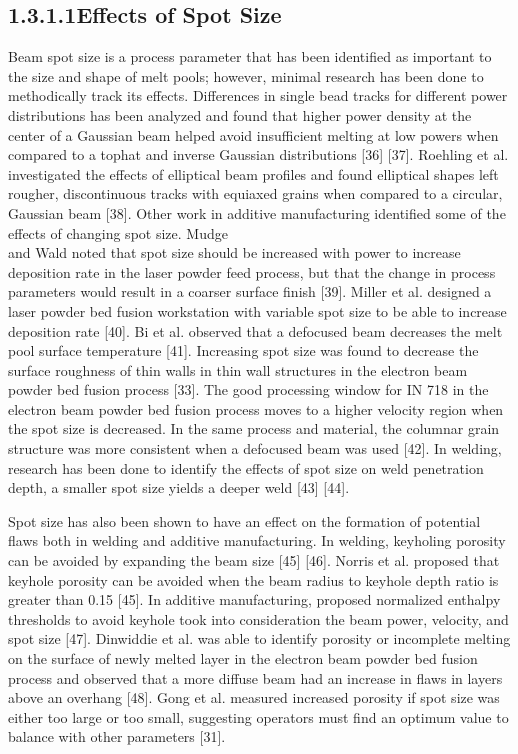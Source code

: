 \documentclass[10pt]{article}
\begin{document}
\subsection*{1.3.1.1Effects of Spot Size}
Beam spot size is a process parameter that has been identified as important to the size and shape of melt pools; however, minimal research has been done to methodically track its effects. Differences in single bead tracks for different power distributions has been analyzed and found that higher power density at the center of a Gaussian beam helped avoid insufficient melting at low powers when compared to a tophat and inverse Gaussian distributions [36] [37]. Roehling et al. investigated the effects of elliptical beam profiles and found elliptical shapes left rougher, discontinuous tracks with equiaxed grains when compared to a circular, Gaussian beam [38]. Other work in additive manufacturing identified some of the effects of changing spot size. Mudge\\
and Wald noted that spot size should be increased with power to increase deposition rate in the laser powder feed process, but that the change in process parameters would result in a coarser surface finish [39]. Miller et al. designed a laser powder bed fusion workstation with variable spot size to be able to increase deposition rate [40]. Bi et al. observed that a defocused beam decreases the melt pool surface temperature [41]. Increasing spot size was found to decrease the surface roughness of thin walls in thin wall structures in the electron beam powder bed fusion process [33]. The good processing window for IN 718 in the electron beam powder bed fusion process moves to a higher velocity region when the spot size is decreased. In the same process and material, the columnar grain structure was more consistent when a defocused beam was used [42]. In welding, research has been done to identify the effects of spot size on weld penetration depth, a smaller spot size yields a deeper weld [43] [44].

Spot size has also been shown to have an effect on the formation of potential flaws both in welding and additive manufacturing. In welding, keyholing porosity can be avoided by expanding the beam size [45] [46]. Norris et al. proposed that keyhole porosity can be avoided when the beam radius to keyhole depth ratio is greater than 0.15 [45]. In additive manufacturing, proposed normalized enthalpy thresholds to avoid keyhole took into consideration the beam power, velocity, and spot size [47]. Dinwiddie et al. was able to identify porosity or incomplete melting on the surface of newly melted layer in the electron beam powder bed fusion process and observed that a more diffuse beam had an increase in flaws in layers above an overhang [48]. Gong et al. measured increased porosity if spot size was either too large or too small, suggesting operators must find an optimum value to balance with other parameters [31].
\end{document}
